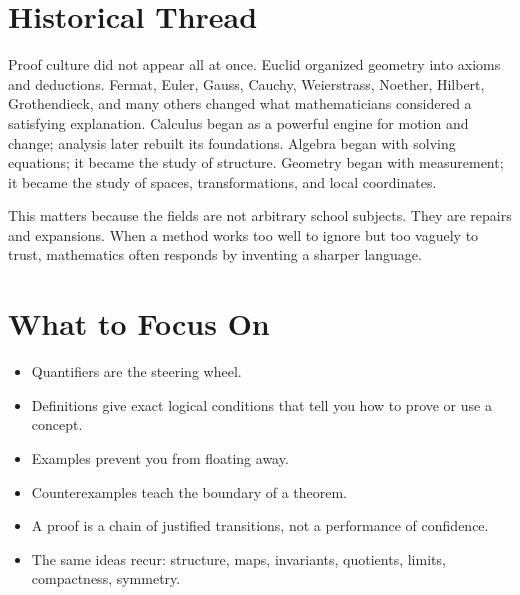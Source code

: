 \documentclass[11pt]{article}
\begin{document}
\section{Historical Thread}

Proof culture did not appear all at once. Euclid organized geometry into axioms and deductions. Fermat, Euler, Gauss, Cauchy, Weierstrass, Noether, Hilbert, Grothendieck, and many others changed what mathematicians considered a satisfying explanation. Calculus began as a powerful engine for motion and change; analysis later rebuilt its foundations. Algebra began with solving equations; it became the study of structure. Geometry began with measurement; it became the study of spaces, transformations, and local coordinates.

This matters because the fields are not arbitrary school subjects. They are repairs and expansions. When a method works too well to ignore but too vaguely to trust, mathematics often responds by inventing a sharper language.

\section{What to Focus On}

\begin{itemize}
\item Quantifiers are the steering wheel.
\item Definitions give exact logical conditions that tell you how to prove or use a concept.
\item Examples prevent you from floating away.
\item Counterexamples teach the boundary of a theorem.
\item A proof is a chain of justified transitions, not a performance of confidence.
\item The same ideas recur: structure, maps, invariants, quotients, limits, compactness, symmetry.
\end{itemize}
\end{document}
